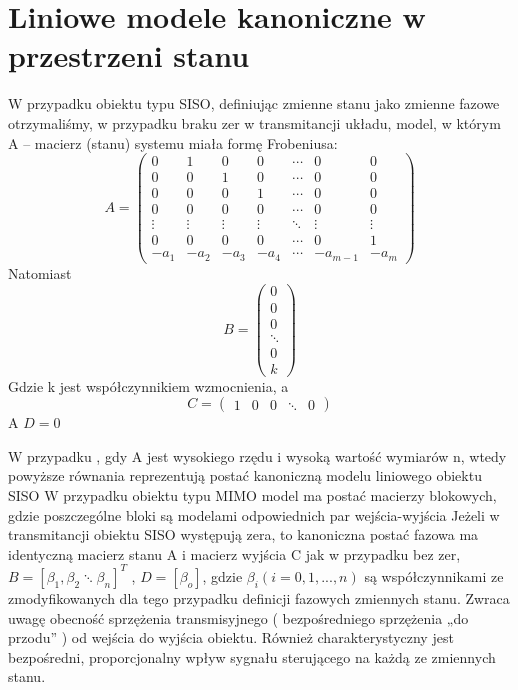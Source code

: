 \documentclass{article}
\begin{document}
	\section{Liniowe modele kanoniczne w przestrzeni stanu}
		W przypadku obiektu typu SISO, definiując zmienne stanu jako zmienne fazowe
		otrzymaliśmy, w przypadku braku zer w transmitancji układu, model, w którym A –
		macierz (stanu) systemu miała formę Frobeniusa:
		\begin{equation}
			A=\begin{pmatrix}
			  0    &   1    &   0    &   0    & \cdots &   0      &   0    \\
			  0    &   0    &   1    &   0    & \cdots &   0      &   0    \\
			  0    &   0    &   0    &   1    & \cdots &   0      &   0    \\
			  0    &   0    &   0    &   0    & \cdots &   0      &   0    \\
			\vdots & \vdots & \vdots & \vdots & \ddots & \vdots   & \vdots \\
			  0    &   0    &   0    &   0    & \cdots &   0      &   1    \\
			 -a_{1}&  -a_{2}&  -a_{3}&  -a_{4}& \cdots & -a_{m-1} & -a_{m}
			\end{pmatrix}
		\end{equation}
		Natomiast 
		\begin{equation}
			B = 
			\begin{pmatrix}
				0 \\
				0 \\
				0 \\
				\ddots \\
				0 \\
				k 
			\end{pmatrix}
		\end{equation}
		Gdzie k jest współczynnikiem wzmocnienia, a 
		\begin{equation}
			C = 
			\begin{pmatrix}
				1 & 0 & 0 & \ddots & 0
			\end{pmatrix}
		\end{equation}
		A $D=0$
 
		W przypadku , gdy A jest wysokiego rzędu i wysoką wartość wymiarów n, wtedy
		powyższe równania reprezentują postać kanoniczną modelu liniowego obiektu SISO
		\newline
		W przypadku obiektu typu MIMO model ma postać macierzy blokowych,
		gdzie poszczególne bloki są modelami odpowiednich par wejścia-wyjścia
		Jeżeli w transmitancji obiektu SISO występują zera, to kanoniczna postać fazowa ma identyczną
		macierz stanu A i macierz wyjścia C jak w przypadku bez zer, $B = [ \beta_1, \beta_2 \ddots \beta_n]^T$ , $D = [ \beta_o ]$, gdzie
		$\beta_i (i=0, 1, . . . , n)$ są współczynnikami ze zmodyfikowanych dla
		tego przypadku definicji
		fazowych zmiennych stanu. Zwraca uwagę obecność sprzężenia transmisyjnego (
		bezpośredniego sprzężenia „do przodu” ) od wejścia do wyjścia obiektu. Również
		charakterystyczny jest bezpośredni, proporcjonalny wpływ sygnału sterującego na każdą
		ze zmiennych stanu.
\end{document}
